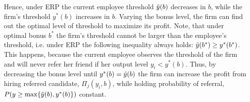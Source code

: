 \documentclass[12pt]{article}
\begin{document}
Hence, under ERP the current employee threshold $\Tilde{y}(b)$ decreases in $b$, while the firm's threshold $y^*(b)$ increases in $b$. Varying the bonus level, the firm can find out the optimal level of threshold to maximize its profit. Note, that under optimal bonus $b^*$ the firm's threshold cannot be larger than the employee's threshold, i.e. under ERP the following inequality always holds: $\Tilde{y}(b^*) \geq y^*(b^*)$. This happens, because the current employee observes the threshold of the firm and will never refer her friend if her output level $y_i < y^*(b)$. Thus, by decreasing the bonus level until $y^*(b) = \Tilde{y}(b)$ the firm can increase the profit from hiring referred candidate, $\Pi_j(y_i, b)$, while holding probability of referral, $P(y \geq \max \lbrace \Tilde{y}(b), y^*(b)\rbrace)$ constant. 
\end{document}
